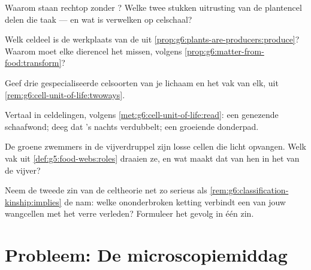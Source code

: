 \begin{exercise}[$\star\star$]\label{exo:g6:cell-unit-of-life:7}
Waarom staan  rechtop zonder ? Welke twee stukken uitrusting
van de plantencel delen die taak --- en wat is verwelken op celschaal?
\end{exercise}

\begin{exercise}[$\star\star$]\label{exo:g6:cell-unit-of-life:8}
Welk celdeel is de werkplaats van de  uit
\cref{prop:g6:plants-are-producers:produce}? Waarom moet elke dierencel
het missen, volgens \cref{prop:g6:matter-from-food:transform}?
\end{exercise}

\begin{exercise}[$\star\star$]\label{exo:g6:cell-unit-of-life:9}
Geef drie gespecialiseerde celsoorten van je lichaam en het vak van elk,
uit \cref{rem:g6:cell-unit-of-life:twoways}.
\end{exercise}

\begin{exercise}[$\star\star$]\label{exo:g6:cell-unit-of-life:10}
Vertaal in celdelingen, volgens
\cref{met:g6:cell-unit-of-life:read}: een genezende schaafwond; deeg dat
's nachts verdubbelt; een groeiende donderpad.
\end{exercise}

\begin{exercise}[$\star\star$]\label{exo:g6:cell-unit-of-life:11}
De groene zwemmers in de vijverdruppel zijn losse cellen die licht
opvangen. Welk vak uit \cref{def:g5:food-webs:roles} draaien ze, en wat
maakt dat van hen in het  van de vijver?
\end{exercise}

\begin{exercise}[$\star\star\star$]\label{exo:g6:cell-unit-of-life:12}
Neem de tweede zin van de celtheorie net zo serieus als
\cref{rem:g6:classification-kinship:implies} de  nam: welke
ononderbroken ketting verbindt een van jouw wangcellen met het verre
verleden? Formuleer het gevolg in één zin.
\end{exercise}

\section{Probleem: De microscopiemiddag}

